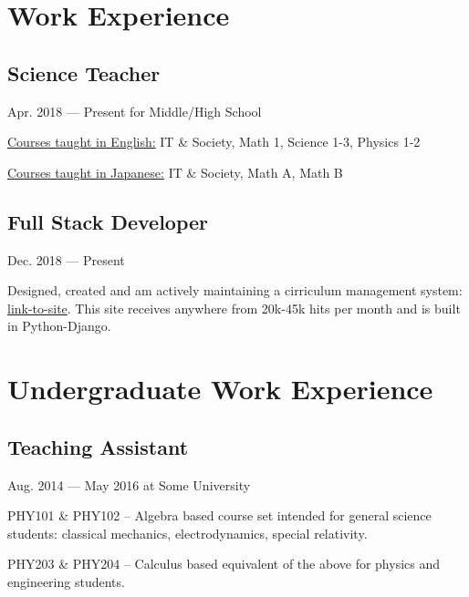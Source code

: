 \documentclass[letterpaper]{easyCV}
\begin{document}
\begin{main}[10pt]
\section{Work Experience}

\subsection{Science Teacher}{Apr. 2018 --- Present 
for Middle/High School}
    \begin{mainlist}
    \item \underline{Courses taught in English:} 
        IT \& Society, Math 1, Science 1-3, Physics 1-2
    \item \underline{Courses taught in Japanese:} 
        IT \& Society, Math A, Math B
    \end{mainlist}

\subsection{Full Stack Developer}
{Dec. 2018 --- Present}
    \begin{mainlist}
    \item Designed, created and am actively maintaining
        a cirriculum management system: 
        \href{link-to-site}{link-to-site}. This site 
        receives anywhere from 20k-45k hits per month 
        and is built in Python-Django.
    \end{mainlist}

\section{Undergraduate Work Experience}

\subsection{Teaching Assistant}{Aug. 2014 --- May 2016
at Some University}
    \begin{mainlist}
        \item PHY101 \& PHY102 -- Algebra based course
            set intended for general science students:
            classical mechanics, electrodynamics, 
            special relativity.

        \item PHY203 \& PHY204 -- Calculus based 
            equivalent of the above for physics 
            and engineering students.
    \end{mainlist}


\end{main}
\end{document}
